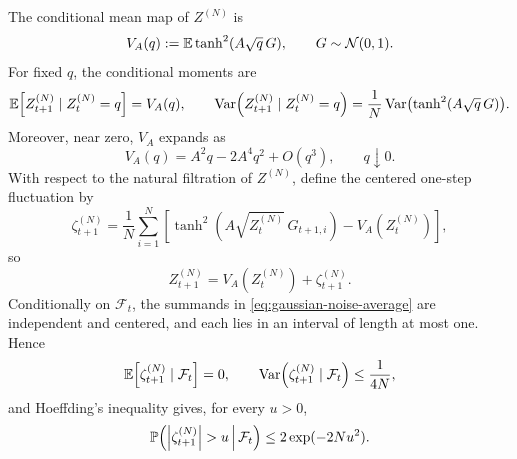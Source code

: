 \documentclass[11pt,reqno,a4paper]{article}
\newcommand{\Pp}{\P}
\newcommand{\Ee}{\E}
\DeclareMathOperator{\Var}{Var}
\begin{document}
The conditional mean map of $Z^{(N)}$ is
\begin{equation}\label{eq:mean-field-map}
  V_A(q):=\Ee\tanh^2(A\sqrt q\,G),
  \qquad
  G\sim\mathcal N(0,1).
\end{equation}
For fixed $q$, the conditional moments are
\begin{equation}\label{eq:gaussian-q-moments}
  \Ee\left[Z_{t+1}^{(N)}\mid Z_t^{(N)}=q\right]=V_A(q),
  \qquad
  \Var\left(Z_{t+1}^{(N)}\mid Z_t^{(N)}=q\right)
  =
  \frac1N
  \Var\left(\tanh^2(A\sqrt q\,G)\right).
\end{equation}
Moreover, near zero, $V_A$ expands as
\begin{equation}\label{eq:gaussian-mean-field-near-zero}
  V_A(q)
  =
  A^2q-2A^4q^2+O(q^3),
  \qquad q\downarrow0.
\end{equation}
With respect to the natural filtration of $Z^{(N)}$, define the centered
one-step fluctuation by
\begin{equation}\label{eq:gaussian-noise-average}
  \zeta_{t+1}^{(N)}
  =
  \frac1N\sum_{i=1}^N
  \left[
    \tanh^2(A\sqrt{Z_t^{(N)}}\,G_{t+1,i})
    -V_A(Z_t^{(N)})
  \right],
\end{equation}
so
\begin{equation}\label{eq:gaussian-noise-decomposition}
  Z_{t+1}^{(N)}
  =
  V_A(Z_t^{(N)})+\zeta_{t+1}^{(N)}.
\end{equation}
Conditionally on $\mathcal F_t$, the summands in
\cref{eq:gaussian-noise-average} are independent and centered, and each lies
in an interval of length at most one. Hence
\begin{equation}\label{eq:gaussian-noise-moments}
  \Ee\left[\zeta_{t+1}^{(N)}\mid\mathcal F_t\right]=0,
  \qquad
  \Var\left(\zeta_{t+1}^{(N)}\mid\mathcal F_t\right)
  \leq \frac1{4N},
\end{equation}
and Hoeffding's inequality gives, for every $u>0$,
\begin{equation}\label{eq:gaussian-noise-hoeffding}
  \Pp\left(
    \abs{\zeta_{t+1}^{(N)}}>u
    \,\middle|\,\mathcal F_t
  \right)
  \leq
  2\exp(-2Nu^2).
\end{equation}
\end{document}
